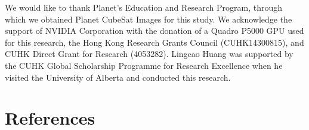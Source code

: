 \documentclass[authoryear,preprint,review,12pt]{elsarticle}
\begin{document}
We would like to thank Planet’s Education and Research Program, through which we obtained Planet CubeSat Images for this study. We acknowledge the support of NVIDIA Corporation with the donation of a Quadro P5000 GPU used for this research, the Hong Kong Research Grants Council (CUHK14300815), and CUHK Direct Grant for Research (4053282). Lingcao Huang was supported by the CUHK Global Scholarship Programme for Research Excellence when he visited the University of Alberta and conducted this research. 





\section{References}
\label{sec_reference}

 



%
%
\end{document}
